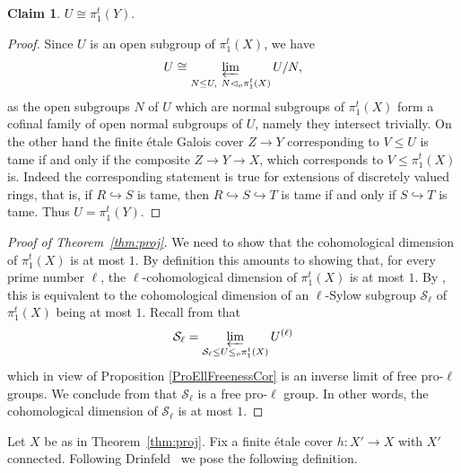 \documentclass[12pt]{amsart}
\theoremstyle{plain}
\theoremstyle{definition}
\newtheorem{claim}[thm]{Claim}
\numberwithin{thm}{section}
\numberwithin{equation}{section}
\begin{document}
\begin{claim}
$U \cong \pi_1^t(Y)$.

\end{claim}
\begin{proof}
Since  $U$ is an open subgroup of $\pi_1^t(X)$, we have 
\begin{equation} \label{OpenSubgroupBasicCofinality}
U \cong \varprojlim_{\substack{N \leq U, \  N \lhd_o \pi_1^t(X)}} U/N,  \notag
\end{equation}
as  the open subgroups $N$ of $U$ which are normal subgroups of $\pi_1^t (X)$  form a cofinal family of open normal subgroups of $U$, namely they intersect trivially. On the other hand the finite \'etale Galois cover 
$Z\to Y$  corresponding to $V\leq U$ is tame if and only if the composite $Z\to Y\to X$, which corresponds to $V\le \pi_1^t(X)$ is. Indeed 
 the corresponding statement is true for extensions of discretely valued rings, that is, if $R\hookrightarrow S$ is tame, then 
$R\hookrightarrow S\hookrightarrow T$ is tame if and only if $S\hookrightarrow T$ is tame. 
Thus $U=\pi_1^t(Y)$. 


\end{proof}





\begin{proof}[Proof of Theorem~\ref{thm:proj}]
We need to show that the cohomological dimension of $\pi_1^t(X)$ is at most $1$.
By definition this amounts to showing that, for every prime number $\ell$, the $\ell$-cohomological dimension of $\pi_1^t(X)$ is at most $1$.
By \cite[Corollary 3.3.6]{NSW13}, this is equivalent to the cohomological dimension of an $\ell$-Sylow subgroup $\mathcal{S}_\ell$ of $\pi_1^t(X)$ being at most $ 1$. 
Recall from \cite[page 209]{NSW13} that
\begin{equation}
\mathcal{S}_\ell = \varprojlim_{\mathcal{S}_{\ell} \leq U \leq_o  \pi_1^t(X)} U^{(\ell)} \notag
\end{equation}
which in view of Proposition \ref{ProEllFreenessCor} is an inverse limit of free pro-$\ell$ groups.
We conclude from \cite[Theorem 3.5.15]{RZ10} that $\mathcal{S}_\ell$ is a free pro-$\ell$ group.
In other words, the cohomological dimension of $\mathcal{S}_\ell$ is at most $1$. 
\end{proof}

Let $X$ be as in Theorem~\ref{thm:proj}. Fix a finite \'etale cover $h: X'\to X$ with  $X'$ connected. Following Drinfeld~\cite[Theorem~2.5 (ii)]{Dri12} we pose the following definition. 
\end{document}
